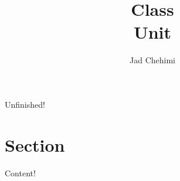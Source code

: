 \documentclass[a4paper,12pt]{article}
\title{Class \\ Unit}
\author{Jad Chehimi}
\begin{document}
\maketitle

\begin{center}
\Huge
Unfinished!
\normalsize
\end{center}

\tableofcontents

\pagebreak

\section{Section}
Content!
\end{document}

